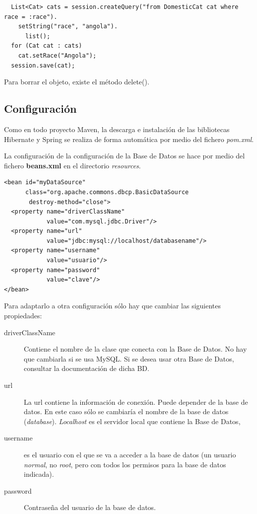 \documentclass[11pt]{article}
\begin{document}
\begin{lstlisting}
  List<Cat> cats = session.createQuery("from DomesticCat cat where race = :race").
    setString("race", "angola").
      list();
  for (Cat cat : cats)
    cat.setRace("Angola");
  session.save(cat);
\end{lstlisting}

Para borrar el objeto, existe el método \textsf{delete()}.


\subsection{Configuración} \label{sec-6-4} \label{cfgorm}

Como en todo proyecto Maven, la descarga e instalación de las bibliotecas Hibernate
y Spring se realiza de forma automática por medio del fichero \emph{pom.xml}.

La configuración de la configuración de la Base de Datos se hace por medio del
fichero \textbf{beans.xml} en el directorio \emph{resources}.


\begin{lstlisting}
<bean id="myDataSource"
      class="org.apache.commons.dbcp.BasicDataSource
       destroy-method="close">
  <property name="driverClassName"
            value="com.mysql.jdbc.Driver"/>
  <property name="url"
            value="jdbc:mysql://localhost/databasename"/>
  <property name="username"
            value="usuario"/>
  <property name="password"
            value="clave"/>
</bean>
\end{lstlisting}

Para adaptarlo a otra configuración sólo hay que cambiar las siguientes
propiedades:

\begin{description}

\item[driverClassName] Contiene el nombre de la clase que
conecta con la Base de Datos. No hay que cambiarla si se usa MySQL. Si se
desea usar otra Base de Datos, consultar la documentación de dicha BD.

\item[url] La url contiene la información de conexión. Puede depender de la base
de datos. En este caso sólo se cambiaría el nombre de la base de datos (\emph{database}).
\emph{Localhost} es el servidor local que contiene la Base de Datos,

\item[username] es el usuario con el que se va a acceder a la base de datos (un usuario \emph{normal}, no \emph{root}, pero con todos los permisos para la base de datos indicada).

\item[password] Contraseña del usuario de la base de datos.

\end{description}
\end{document}
